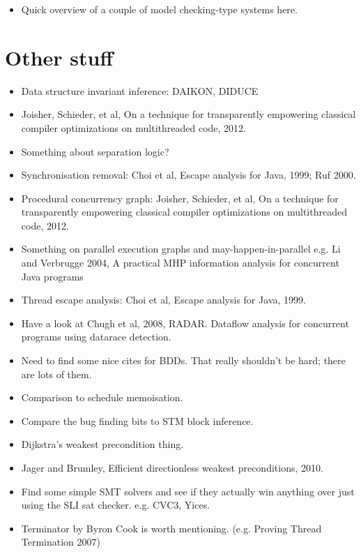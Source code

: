 \begin{itemize}
\item Quick overview of a couple of model checking-type systems here.
\end{itemize}

\section{Other stuff}

\begin{itemize}
\item Data structure invariant inference: DAIKON, DIDUCE
\item
  Joisher, Schieder, et al, On a technique for transparently empowering classical compiler optimizations on multithreaded code, 2012.
\item
  Something about separation logic?
\item
  Synchronisation removal: Choi et al, Escape analysis for Java, 1999; Ruf 2000.
\item
  Procedural concurrency graph: Joisher, Schieder, et al, On a technique for transparently empowering classical compiler optimizations on multithreaded code, 2012.
\item
  Something on parallel execution graphs and may-happen-in-parallel e.g. Li and Verbrugge 2004, A practical MHP information analysis for concurrent Java programs
\item
  Thread escape analysis: Choi et al, Escape analysis for Java, 1999.
\item
  Have a look at Chugh et al, 2008, RADAR.  Dataflow analysis for
  concurrent programs using datarace detection.
\item
  Need to find some nice cites for BDDs.  That really shouldn't be
  hard; there are lots of them.
\item
  Comparison to schedule memoisation.
\item
  Compare the bug finding bits to STM block inference.
\item
  Dijkstra's weakest precondition thing.
\item
  Jager and Brumley, Efficient directionless weakest preconditions, 2010.
\item
  Find some simple SMT solvers and see if they actually win anything over just using the SLI sat checker.
  e.g. CVC3, Yices.
\item
  Terminator by Byron Cook is worth mentioning. (e.g. Proving Thread Termination 2007)
\end{itemize}
